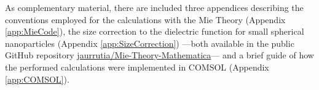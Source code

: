 As complementary material, there are included three appendices describing the conventions employed for the calculations with the Mie Theory (Appendix \ref{app:MieCode}), the size correction to the dielectric function for small spherical nanoparticles (Appendix \ref{app:SizeCorrection}) ---both available in the public GitHub repository \href{https://github.com/jaurrutia/Mie-Theory-Mathematica}{jaurrutia/Mie-Theory-Mathematica}--- and a brief guide of how the performed calculations were implemented in COMSOL (Appendix \ref{app:COMSOL}).





